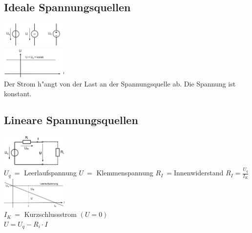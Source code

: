 \subsection{Ideale Spannungsquellen}
\begin{multicols}{4}
\includegraphics[width=0.25\textwidth]{pics/quellen/UQsymbole}\\
\includegraphics[width=0.25\textwidth]{pics/quellen/QUkennlinie}\\
Der Strom h"angt von der Last an der Spannungsquelle ab. Die Spannung ist konstant.\\
\end{multicols}

\subsection{Lineare Spannungsquellen}
\begin{multicols}{4}
\includegraphics[width=0.25\textwidth]{pics/quellen/lUEquelle}\\
$U_q\ =$ Leerlaufspannung
$U\ =$ Klemmenspannung
$R_I\ =$Innenwiderstand
$R_I=\frac{U_q}{I_K}$\\
\includegraphics[width=0.25\textwidth]{pics/quellen/UIkennlinie}\\
$I_K\ =$ Kurzschlussstrom $(U=0)$\\
$U = U_{q} - R_{i} \cdot I$
\end{multicols}

